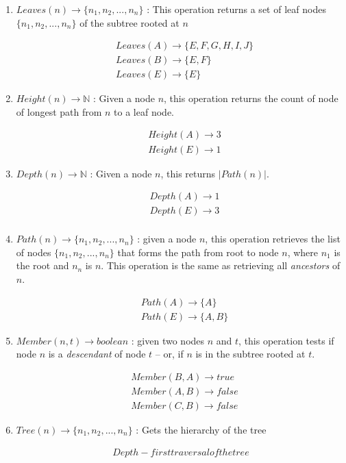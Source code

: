 \begin{enumerate}
\item $Leaves(n) \rightarrow \{n_1, n_2, ..., n_n\}$ : This operation returns a set of leaf nodes $\{n_1, n_2, ..., n_n\}$ of the subtree rooted at $n$

    \begin{align*}
    & Leaves(A) \rightarrow \{E, F, G, H, I, J\} \\
    & Leaves(B) \rightarrow \{E, F\} \\
    & Leaves(E) \rightarrow \{E\}
    \end{align*}
    
\item $Height(n) \rightarrow \mathbb{N}$ : Given a node $n$, this operation returns the count of node of longest path from $n$ to a leaf node.

    \begin{align*}
    & Height(A) \rightarrow 3 \\
    & Height(E) \rightarrow 1
    \end{align*}
    
\item $Depth(n) \rightarrow \mathbb{N}$ : Given a node $n$, this returns $|Path(n)|$.

    \begin{align*}
    & Depth(A) \rightarrow 1 \\
    & Depth(E) \rightarrow 3 \\
    \end{align*}
    
\item $Path(n) \rightarrow \{n_1, n_2, ..., n_n\}$ : given a node $n$, this operation retrieves the list of nodes $\{n_1, n_2, ..., n_n\}$ that forms the path from root to node $n$, where $n_1$ is the root and $n_n$ is $n$. This operation is the same as retrieving all \emph{ancestors} of $n$.

    \begin{align*}
    & Path(A) \rightarrow \{A\} \\
    & Path(E) \rightarrow \{A, B\}
    \end{align*}
    
\item $Member(n, t) \rightarrow boolean$ : given two nodes $n$ and $t$, this operation tests if node $n$ is a \emph{descendant} of node $t$ -- or, if $n$ is in the subtree rooted at $t$.


    \begin{align*}
    & Member(B, A) \rightarrow true \\
    & Member(A, B) \rightarrow false \\
    & Member(C, B) \rightarrow false
    \end{align*}
    
\item $Tree(n) \rightarrow \{n_1, n_2, ..., n_n\}$ : Gets the hierarchy of the tree

    \begin{align*}
    Depth-first traversal of the tree
    \end{align*}

\end{enumerate} %


